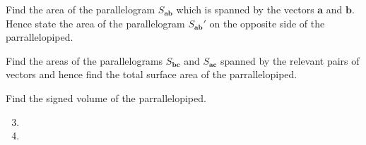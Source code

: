 \documentclass[11pt,a4paper,titlepage,oneside,openany]{article}
\numberwithin{equation}{section}
\numberwithin{algorithm}{section}
\numberwithin{figure}{section}
\numberwithin{table}{section}
\renewcommand{\vec}[1]{\mathbf{#1}}
\begin{document}
  \begin{enumerate}
    \renewcommand{\theenumi}{\roman{enumi})}
    \renewcommand{\labelenumi}{\theenumi}
  {\setlength\itemindent{3em} \item
    Find the area of the parallelogram $S_{\vec{a}\vec{b}}$ which is spanned by the vectors $\vec{a}$ and $\vec{b}$. Hence state the area of the parallelogram $S_{\vec{a}\vec{b}}'$ on the opposite side of the parrallelopiped.}
  {\setlength\itemindent{3em} \item
    Find the areas of the parallelograms $S_{\vec{b}\vec{c}}$ and $S_{\vec{a}\vec{c}}$ spanned by the relevant pairs of vectors and hence find the total surface area of the parrallelopiped.}
  {\setlength\itemindent{3em} \item
    Find the signed volume of the parrallelopiped.}
  \end{enumerate}

\begin{enumerate}
\setcounter{enumi}{2}
\item
\item
\end{enumerate}
\end{document}
